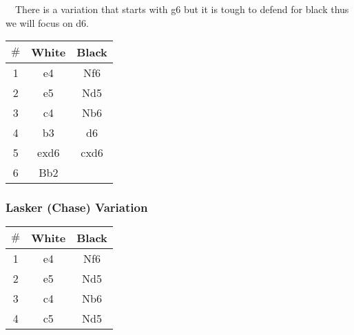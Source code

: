 \documentclass{article}
\newcommand{\tab}{$\quad$}
\newcommand{\smalls}{\par\smallskip}
\begin{document}
        \tab There is a variation that starts with g6 but it is tough to defend
        for black thus we will focus on d6.

        \begin{multicols}{2}
            \showboard
            \smalls
            \begin{tabular}{c|c|c}
            $\#$ & White & Black\\
                \hline
                1 & e4 & Nf6 \\
                2 & e5 & Nd5 \\
                3 & c4 & Nb6 \\
                4 & b3 & d6 \\
                5 & exd6 & cxd6 \\
                6 & Bb2 & \\
            \end{tabular}
        \end{multicols}


        \subsubsection*{Lasker (Chase) Variation}
        \begin{multicols}{2}
            \showboard
            \smalls
            \begin{tabular}{c|c|c}
                $\#$ & White & Black\\
                \hline
                1 & e4 & Nf6 \\
                2 & e5 & Nd5 \\
                3 & c4 & Nb6 \\
                4 & c5 & Nd5 \\
            \end{tabular}
        \end{multicols}
\end{document}
